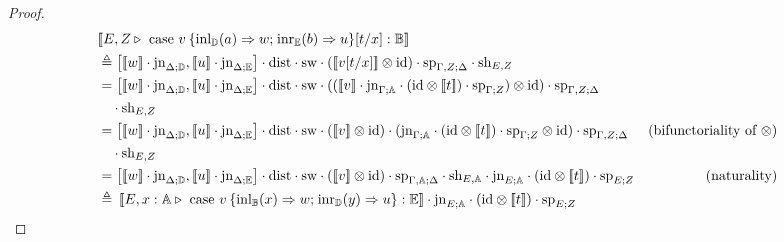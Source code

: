 \documentclass[10pt,a4paper]{amsart}
\theoremstyle{definition}
\theoremstyle{definition}
\theoremstyle{definition}
\theoremstyle{definition}
\theoremstyle{definition}
\theoremstyle{definition}
\begin{document}
\begin{proof}
\begin{align*}
  &[\![E, Z \triangleright \text{ case } v  \hspace{2pt}  \{\text{inl}_{\mathbb{D}} (a) \Rightarrow w ; \hspace{1pt} \text{inr}_{\mathbb{E}} (b) \Rightarrow u\} [t/x]: \mathbb{B}]\!] \\
  & \triangleq  \left[[\![ w]\!] \cdot \text{jn}_{ \Delta;\mathbb{D}},[\![ u ]\!] \cdot \text{jn}_{ \Delta;\mathbb{E}}\right] \cdot \text{dist} \cdot \text{sw} \cdot ([\![ v [t/x] ]\!]   \otimes \text{id})  \cdot \text{sp}_{\Gamma, Z;\Delta} \cdot \text{sh}_{E,Z} \\
  & = \left[[\![w]\!] \cdot \text{jn}_{ \Delta;\mathbb{D}},[\![u ]\!] \cdot \text{jn}_{ \Delta;\mathbb{E}}\right] \cdot \text{dist} \cdot \text{sw} \cdot (([\![ v]\!]  \cdot \text{jn}_{\Gamma; \mathbb{A}} \cdot (\text{id} \otimes [\![  t ]\!] ) \cdot \text{sp}_{\Gamma;Z} )\otimes \text{id}) \cdot \text{sp}_{\Gamma, Z;\Delta} \\
  & \hspace{10pt} \cdot \text{sh}_{E,Z} \\
  & =  \left[[\![w]\!] \cdot \text{jn}_{ \Delta;\mathbb{D}},[\![u ]\!] \cdot \text{jn}_{ \Delta;\mathbb{E}}\right] \cdot \text{dist} \cdot \text{sw} \cdot ([\![ v]\!] \otimes \text{id}) \cdot (\text{jn}_{\Gamma; \mathbb{A}} \cdot (\text{id} \otimes [\![  t ]\!] ) \cdot \text{sp}_{\Gamma;Z} \otimes \text{id}) \cdot \text{sp}_{\Gamma, Z;\Delta}  & {\text{(bifunctoriality of $\otimes$)}} \\
  & \hspace{10pt} \cdot \text{sh}_{E,Z}\\
  & = \left[[\![w]\!] \cdot \text{jn}_{ \Delta;\mathbb{D}},[\![u ]\!] \cdot \text{jn}_{ \Delta;\mathbb{E}}\right] \cdot \text{dist} \cdot \text{sw} \cdot ([\![ v]\!] \otimes \text{id}) \cdot \text{sp}_{\Gamma, \typeA;\Delta}  \cdot \text{sh}_{E,\typeA}  \cdot  \text{jn}_{E; \typeA} \cdot (\text{id} \otimes [\![ t ]\!] ) \cdot \text{sp}_{E;Z}  & {(\text{naturality})}   \\
  & \triangleq  \hspace{2pt} [\![E,  x:\mathbb{A} \triangleright \text{ case } v \hspace{2pt}  \{\text{inl}_{\mathbb{B}} (x) \Rightarrow w ; \hspace{1pt} \text{inr}_{\mathbb{D}} (y) \Rightarrow u\}: \mathbb{E}]\!]  \cdot  \text{jn}_{E; \typeA} \cdot (\text{id} \otimes [\![ t ]\!] ) \cdot \text{sp}_{E;Z}
\end{align*}
\end{proof}
\end{document}
